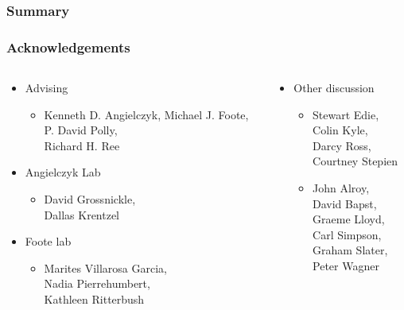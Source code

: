 \documentclass{beamer}
\begin{document}
%
%
\begin{frame}
  \frametitle{Summary}
\end{frame}

\begin{frame}
  \frametitle{Acknowledgements}
  \begin{columns}
    \begin{column}{0.5\textwidth}
      \begin{itemize}
        \item Advising
          \begin{itemize}
            \item Kenneth D. Angielczyk, Michael J. Foote, \\P. David Polly, \\Richard H. Ree
          \end{itemize}
        \item Angielczyk Lab
          \begin{itemize}
            \item David Grossnickle, \\Dallas Krentzel
          \end{itemize}
        \item Foote lab
          \begin{itemize}
            \item Marites Villarosa Garcia, \\Nadia Pierrehumbert, \\Kathleen Ritterbush
          \end{itemize}
      \end{itemize}
    \end{column}
    \begin{column}{0.5\textwidth}
      \begin{itemize}
        \item Other discussion
          \begin{itemize}
            \item Stewart Edie, \\Colin Kyle, \\Darcy Ross, \\Courtney Stepien
            \item John Alroy, \\David Bapst, \\Graeme Lloyd, \\Carl Simpson, \\Graham Slater, \\Peter Wagner
          \end{itemize}
      \end{itemize}
    \end{column}
  \end{columns}
\end{frame}
\end{document}
